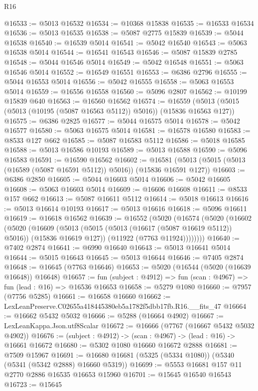 \begin{lexlean}{R16}
\begin{coremodule}
@16533 := @5013 @16532
@16534 := @10368 @15838
@16535 := @16533 @16534
@16536 := @5013 @16535
@16538 := @5087 @2775 @15839
@16539 := @5044 @16538
@16540 := @16539 @5014
@16541 := @5042 @16540
@16543 := @5063 @16538 @5014
@16544 := @16541 @16543
@16546 := @5087 @15839 @2785
@16548 := @5044 @16546 @5014
@16549 := @5042 @16548
@16551 := @5063 @16546 @5014
@16552 := @16549 @16551
@16553 := @6386 @2796
@16555 := @5044 @16553 @5014
@16556 := @5042 @16555
@16558 := @5063 @16553 @5014
@16559 := @16556 @16558
@16560 := @5096 @2807
@16562 := @10199 @15839 @640
@16563 := @16560 @16562
@16574 := @16559 (@5013 (@5015 (@5013 (@10195 (@5087 @16563 @5112)) @5016)) (@15836 @16563 @127))
@16575 := @6386 @2825
@16577 := @5044 @16575 @5014
@16578 := @5042 @16577
@16580 := @5063 @16575 @5014
@16581 := @16578 @16580
@16583 := @8533 @127 @662
@16585 := @5087 @16583 @5112
@16586 := @5018 @16585
@16588 := @5013 @16586 @10193
@16589 := @5013 @16588
@16590 := @5096 @16583
@16591 := @16590 @16562
@16602 := @16581 (@5013 (@5015 (@5013 (@16589 (@5087 @16591 @5112)) @5016)) (@15836 @16591 @127))
@16603 := @6386 @2850
@16605 := @5044 @16603 @5014
@16606 := @5042 @16605
@16608 := @5063 @16603 @5014
@16609 := @16606 @16608
@16611 := @8533 @157 @662
@16613 := @5087 @16611 @5112
@16614 := @5018 @16613
@16616 := @5013 @16614 @10193
@16617 := @5013 @16616
@16618 := @5096 @16611
@16619 := @16618 @16562
@16639 := @16552
    (@5020
      (@16574
        (@5020
          (@16602
            (@5020
              (@16609
                (@5013 (@5015 (@5013 (@16617 (@5087 @16619 @5112)) @5016)) (@15836 @16619 @127))
                (@11922 (@7763 @11924))))))))
@16640 := @7402 @2874
@16641 := @6990 @16640
@16643 := @5013 @16641 @5014
@16644 := @5015 @16643
@16645 := @5013 @16644
@16646 := @7405 @2874
@16648 := @16645 (@7763 @16646)
@16653 := @5020 (@16544 (@5020 (@16639 @16648)) @16648)
@16657 := fun (subject : @4912) => fun (scan : @4967) => fun (lead : @16) => @16536 @16653
@16658 := @5279 @1080
@16660 := @7957 (@7756 @5285)
@16661 := @16658 @16660
@16662 := LexLeanPreserve.C02655a418445380eb5a1782f5dbb17fb.R16.__fits_47
@16664 := @16662 @5432 @5032
@16666 := @5288 (@16664 @4902)
@16667 := LexLeanKappa.Json.utf8Scalar
@16672 := @16666 (@7767 (@16667 @5432 @5032 @4902))
@16676 := (subject : @4912) -> (scan : @4967) -> (lead : @16) -> @16661 @16672
@16680 := @5302 @1080 @16660 @16672 @2888
@16681 := @7509 @15967
@16691 := @16680 @16681 (@5325 (@5334 @1080)) (@5340 (@5341 (@5342 @2888) @16660 @5319))
@16699 := @5553 @16681 @157 @11 @2770 @2886 @16535 @16653 @15960
@16701 := @15645 @16540 @16543
@16723 := @15645

\end{coremodule}
\end{lexlean}
